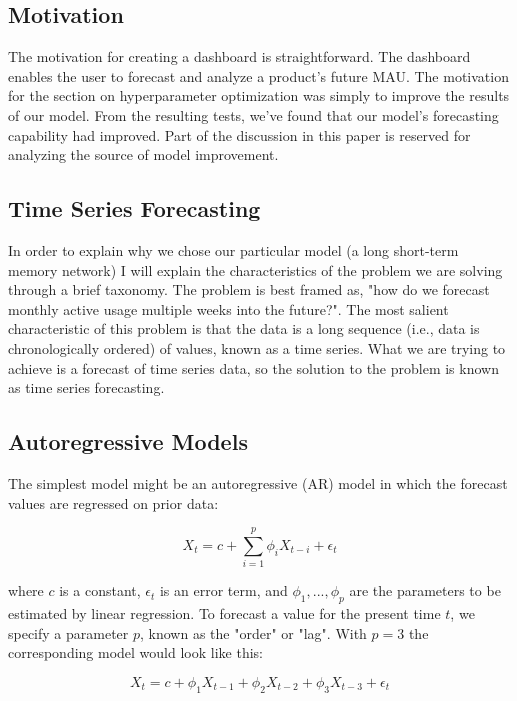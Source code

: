 \documentclass[11pt, oneside]{report}
\begin{document}
\subsection{Motivation}
The motivation for creating a dashboard is straightforward. The dashboard enables the user to forecast and analyze a product's future MAU.
The motivation for the section on hyperparameter optimization was simply to improve the results of our model. From the resulting tests, we've found that our model's forecasting capability had improved. Part of the discussion in this paper is reserved for analyzing the source of model improvement.

\subsection{Time Series Forecasting}

In order to explain why we chose our particular model (a long short-term memory network) I will explain the characteristics of the problem we are solving through a brief taxonomy. The problem is best framed as, "how do we forecast monthly active usage multiple weeks into the future?". The most salient characteristic of this problem is that the data is a long sequence (i.e., data is chronologically ordered) of values, known as a time series. What we are trying to achieve is a forecast of time series data, so the solution to the problem is known as time series forecasting.

\subsection{Autoregressive Models}

The simplest model might be an autoregressive (AR) model in which the forecast values are regressed on prior data:

\begin{equation}
  \label{eq:1}
  X_t = c + \sum_{i=1}^p \phi_i X_{t-i} + \epsilon_t
\end{equation}

where $c$ is a constant, $\epsilon_t$ is an error term, and $\phi_1, ..., \phi_p$ are the parameters to be estimated by linear regression. To forecast a value for the present time $t$, we specify a parameter $p$, known as the "order" or "lag". With $p=3$ the corresponding model would look like this:

\begin{equation}
  \label{eq:2}
  X_t = c + \phi_1 X_{t-1} + \phi_2 X_{t-2} + \phi_3 X_{t-3} + \epsilon_t
\end{equation}
\end{document}
